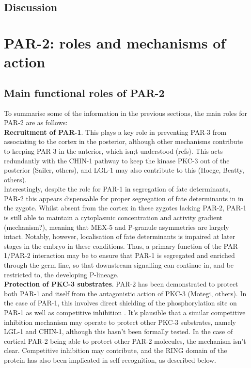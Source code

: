 \documentclass[12pt]{"report"}
\begin{document}
\subsection{Discussion}

\clearpage
\section{PAR-2: roles and mechanisms of action}
\subsection{Main functional roles of PAR-2}

To summarise some of the information in the previous sections, the main roles for PAR-2 are as follows:\\

\textbf{Recruitment of PAR-1}. This plays a key role in preventing PAR-3 from associating to the cortex in the posterior, although other mechanisms contribute to keeping PAR-3 in the anterior, which isn;t understood (refs). This acts redundantly with the CHIN-1 pathway to keep the kinase PKC-3 out of the posterior (Sailer, others), and LGL-1 may also contribute to this (Hoege, Beatty, others). \\

Interestingly, despite the role for PAR-1 in segregation of fate determinants, PAR-2 this appears dispensable for proper segregation of fate determinants in in the zygote. Whilst absent from the cortex in these zygotes lacking PAR-2, PAR-1 is still able to maintain a cytoplasmic concentration and activity gradient (mechanism?), meaning that MEX-5 and P-granule asymmetries are largely intact. Notably, however, localisation of fate determinants is impaired at later stages in the embryo in these conditions. Thus, a primary function of the PAR-1/PAR-2 interaction may be to ensure that PAR-1 is segregated and enriched through the germ line, so that downstream signalling can continue in, and be restricted to, the developing P-lineage. \\

\textbf{Protection of PKC-3 substrates}. PAR-2 has been demonstrated to protect both PAR-1 and itself from the antagonistic action of PKC-3 (Motegi, others). In the case of PAR-1, this involves direct shielding of the phosphorylation site on PAR-1 as well as competitive inhibition \citep{Ramanujam2018}. It’s plausible that a similar competitive inhibition mechanism may operate to protect other PKC-3 substrates, namely LGL-1 and CHIN-1, although this hasn't been formally tested. In the case of cortical PAR-2 being able to protect other PAR-2 molecules, the mechanism isn't clear. Competitive inhibition may contribute, and the RING domain of the protein has also been implicated in self-recognition, as described below. \\
\end{document}
